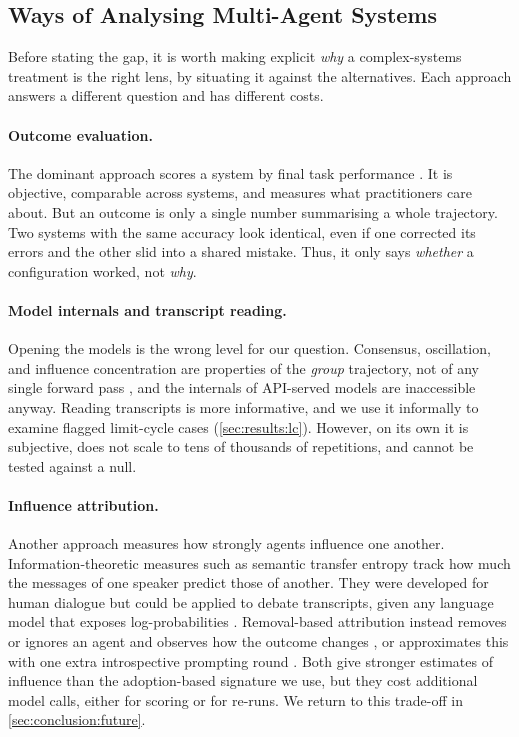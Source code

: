 \subsection{Ways of Analysing Multi-Agent Systems}
\label{sec:related:lenses}

Before stating the gap, it is worth making explicit \emph{why} a
complex-systems treatment is the right lens, by situating it against
the alternatives. Each approach answers a different question and has different
costs.

\paragraph{Outcome evaluation.}
The dominant approach scores a system by final task performance
\citep{du2024improving, liu2025stopovervaluing, zhang2025debateorvote}. It is
objective, comparable across systems, and measures what practitioners care
about. But an outcome is only a single number summarising a whole trajectory. Two
systems with the same accuracy look identical, even if one corrected its errors
and the other slid into a shared mistake. Thus, it only says \emph{whether} a configuration
worked, not \emph{why}.

\paragraph{Model internals and transcript reading.}
Opening the models is the wrong level for our question. Consensus, oscillation,
and influence concentration are properties of the \emph{group} trajectory, not of
any single forward pass \citep[cf.][]{miehling2025agentic}, and the internals of
\ac{API}-served models are inaccessible anyway. Reading transcripts is more
informative, and we use it informally to examine flagged limit-cycle cases
(\autoref{sec:results:lc}). However, on its own it is subjective, does not scale
to tens of thousands of repetitions, and cannot be tested against a null.

\paragraph{Influence attribution.}
Another approach measures how strongly agents influence one another.
Information-theoretic measures such as semantic transfer entropy track how much
the messages of one speaker predict those of another. They were developed for human dialogue
but could be applied to debate transcripts, given any language model that exposes
log-probabilities \citep{infodynamics2026}. Removal-based attribution instead
removes or ignores an agent and observes how the outcome changes
\citep{agentsthatmatter2026}, or approximates this with one extra introspective
prompting round \citep{cui2025introspecloo}. Both give stronger estimates of
influence than the adoption-based signature we use, but they cost additional
model calls, either for scoring or for re-runs. We return to this
trade-off in \autoref{sec:conclusion:future}.

